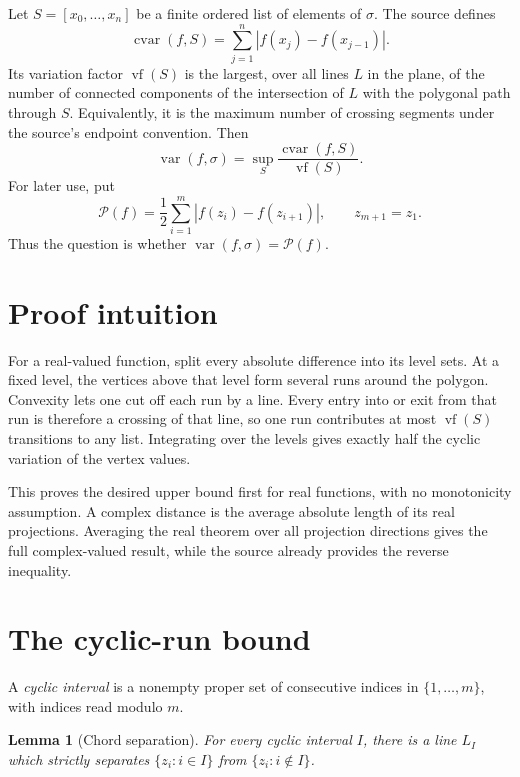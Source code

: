 \documentclass[11pt]{article}
\newtheorem{lemma}{Lemma}
\newcommand{\cvar}{\operatorname{cvar}}
\newcommand{\vf}{\operatorname{vf}}
\newcommand{\Var}{\operatorname{var}}
\newcommand{\Per}{\mathcal P}
\begin{document}
Let $S=[x_0,\ldots,x_n]$ be a finite ordered list of elements of $\sigma$.
The source defines
\[
 \cvar(f,S)=\sum_{j=1}^{n}|f(x_j)-f(x_{j-1})|.
\]
Its variation factor $\vf(S)$ is the largest, over all lines $L$ in the
plane, of the number of connected components of the intersection of $L$ with
the polygonal path through $S$.  Equivalently, it is the maximum number of
crossing segments under the source's endpoint convention.  Then
\[
 \Var(f,\sigma)=\sup_S\frac{\cvar(f,S)}{\vf(S)}.
\]
For later use, put
\begin{equation}
 \Per(f)=\frac12\sum_{i=1}^{m}|f(z_i)-f(z_{i+1})|,
 \qquad z_{m+1}=z_1.
 \label{eq:halfperimeter}
\end{equation}
Thus the question is whether $\Var(f,\sigma)=\Per(f)$.

\section{Proof intuition}

For a real-valued function, split every absolute difference into its level
sets.  At a fixed level, the vertices above that level form several runs
around the polygon.  Convexity lets one cut off each run by a line.  Every
entry into or exit from that run is therefore a crossing of that line, so one
run contributes at most $\vf(S)$ transitions to any list.  Integrating over
the levels gives exactly half the cyclic variation of the vertex values.

This proves the desired upper bound first for real functions, with no
monotonicity assumption.  A complex distance is the average absolute length
of its real projections.  Averaging the real theorem over all projection
directions gives the full complex-valued result, while the source already
provides the reverse inequality.

\section{The cyclic-run bound}

A \emph{cyclic interval} is a nonempty proper set of consecutive indices in
$\{1,\ldots,m\}$, with indices read modulo $m$.

\begin{lemma}[Chord separation]
\label{lem:separator}
For every cyclic interval $I$, there is a line $L_I$ which strictly separates
$\{z_i:i\in I\}$ from $\{z_i:i\notin I\}$.
\end{lemma}
\end{document}
